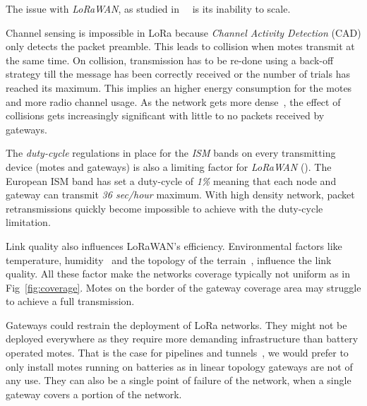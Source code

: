

The issue with \emph{LoRaWAN}, as studied 
in~\cite{8030482}~\cite{10.1145/2988287.2989163} is its inability to scale. 

Channel sensing is impossible in LoRa because \emph{Channel Activity Detection}
(CAD) only detects the packet preamble. %
This leads to collision when motes transmit at the same time.
On collision, transmission has to be re-done using a back-off strategy till the
message has been correctly received or the number of trials has reached its
maximum.
This implies an higher energy consumption for the motes and more radio 
channel usage.
As the network gets more dense~\cite{8030482}, the effect of collisions gets
increasingly significant with little to no packets received by gateways.


The \emph{duty-cycle} regulations in place for the \emph{ISM} bands on every
transmitting device (motes and gateways) is also a limiting factor 
for \emph{LoRaWAN} (\cite{8030482}).
The European ISM band has set a duty-cycle of \emph{1\%} meaning that each node 
and gateway can transmit \emph{36 sec/hour} maximum. 
With high density network, packet retransmissions quickly become impossible to
achieve with the duty-cycle limitation.


Link quality also influences LoRaWAN's efficiency. 
Environmental factors like temperature,
humidity~\cite{evaluation_of_the_reliability_of_lora} and the topology of the
terrain~\cite{lorajambalaya}, influence the link quality.
All these factor make the networks coverage typically not uniform 
as in Fig~\ref{fig:coverage}.
Motes on the border of the gateway coverage area may struggle to
achieve a full transmission. 

Gateways could restrain the deployment of LoRa networks.
They might not be deployed everywhere as they require more demanding infrastructure 
than battery operated motes.
That is the case for pipelines and tunnels~\cite{Abrardo_2019},
we would prefer to only install motes running on batteries as in linear
topology gateways are not of any use.
They can also be a single point of failure of the network, when a single
gateway covers a portion of the network. 

